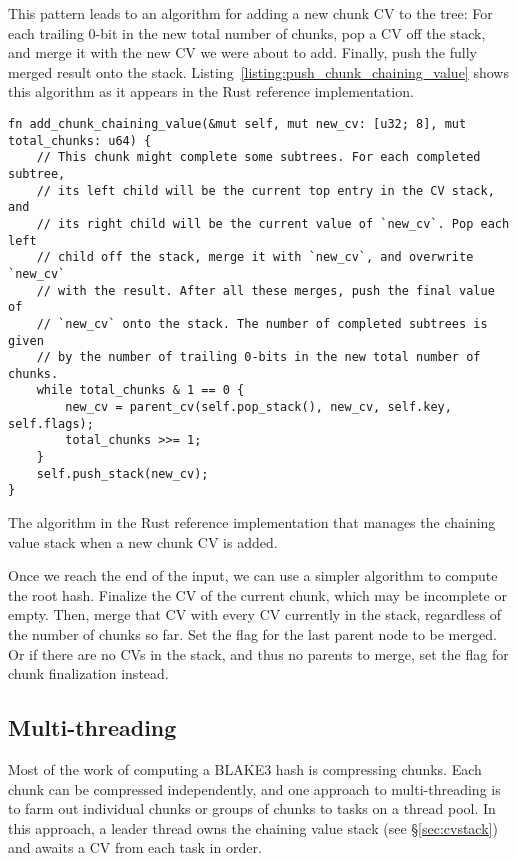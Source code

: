 \documentclass[11pt,notitlepage,a4paper]{article}
\newcommand{\flag}[1]{\texttt{\detokenize{#1}}\xspace}
\begin{document}
This pattern leads to an algorithm for adding a new chunk CV to the tree: For
each trailing 0-bit in the new total number of chunks, pop a CV off the stack,
and merge it with the new CV we were about to add. Finally, push the fully
merged result onto the stack. Listing~\ref{listing:push_chunk_chaining_value}
shows this algorithm as it appears in the Rust reference implementation.

\begin{listing}[h]
\begin{verbatim}
fn add_chunk_chaining_value(&mut self, mut new_cv: [u32; 8], mut total_chunks: u64) {
    // This chunk might complete some subtrees. For each completed subtree,
    // its left child will be the current top entry in the CV stack, and
    // its right child will be the current value of `new_cv`. Pop each left
    // child off the stack, merge it with `new_cv`, and overwrite `new_cv`
    // with the result. After all these merges, push the final value of
    // `new_cv` onto the stack. The number of completed subtrees is given
    // by the number of trailing 0-bits in the new total number of chunks.
    while total_chunks & 1 == 0 {
        new_cv = parent_cv(self.pop_stack(), new_cv, self.key, self.flags);
        total_chunks >>= 1;
    }
    self.push_stack(new_cv);
}
\end{verbatim}
\caption{The algorithm in the Rust reference implementation that manages the
    chaining value stack when a new chunk CV is added.}
\label{listing:push_chunk_chaining_value}
\end{listing}

Once we reach the end of the input, we can use a simpler algorithm to compute
the root hash. Finalize the CV of the current chunk, which may be incomplete or
empty. Then, merge that CV with every CV currently in the stack, regardless of
the number of chunks so far. Set the \flag{ROOT} flag for the last parent node
to be merged. Or if there are no CVs in the stack, and thus no parents to
merge, set the \flag{ROOT} flag for chunk finalization instead.

\subsection{Multi-threading}\label{sec:multithreading}

Most of the work of computing a BLAKE3 hash is compressing chunks. Each chunk
can be compressed independently, and one approach to multi-threading is to farm
out individual chunks or groups of chunks to tasks on a thread pool. In this
approach, a leader thread owns the chaining value stack (see
\S\ref{sec:cvstack}) and awaits a CV from each task in order.
\end{document}
